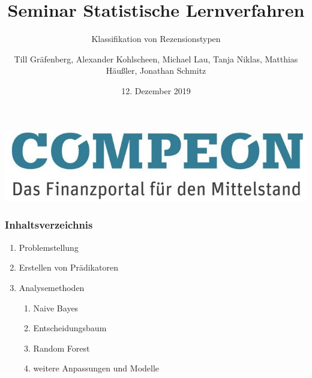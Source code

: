 \documentclass{beamer}
\title{Seminar Statistische Lernverfahren}
\subtitle{Klassifikation von Rezensionstypen}
\author[T.G., A.K., M.L., T.N., M.H., J.S.]{Till Gräfenberg, Alexander Kohlscheen, Michael Lau, Tanja Niklas, Matthias Häußler, Jonathan Schmitz}
\date{12. Dezember 2019}
\begin{document}
\begin{frame}
\thispagestyle{empty}
\begin{flushright}
\includegraphics[scale=0.2]{compeon.png}
\end{flushright}
\titlepage
\end{frame}
\begin{frame}
\addtocounter{framenumber}{-1}
\frametitle{Inhaltsverzeichnis}
\begin{enumerate}\itemsep10pt
\item Problemstellung
\item Erstellen von Prädikatoren
\item Analysemethoden
	\begin{enumerate}
	\item Naive Bayes
	\item Entscheidungsbaum
	\item Random Forest
	\item weitere Anpassungen und Modelle
	\end{enumerate}
\end{enumerate}
\end{frame}
\end{document}
